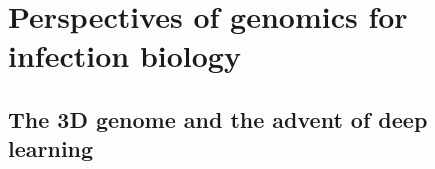 
\chapter{Perspectives of genomics for infection biology} %

\label{ch:03-02} %


\section{The 3D genome and the advent of deep learning}

\blindtext
